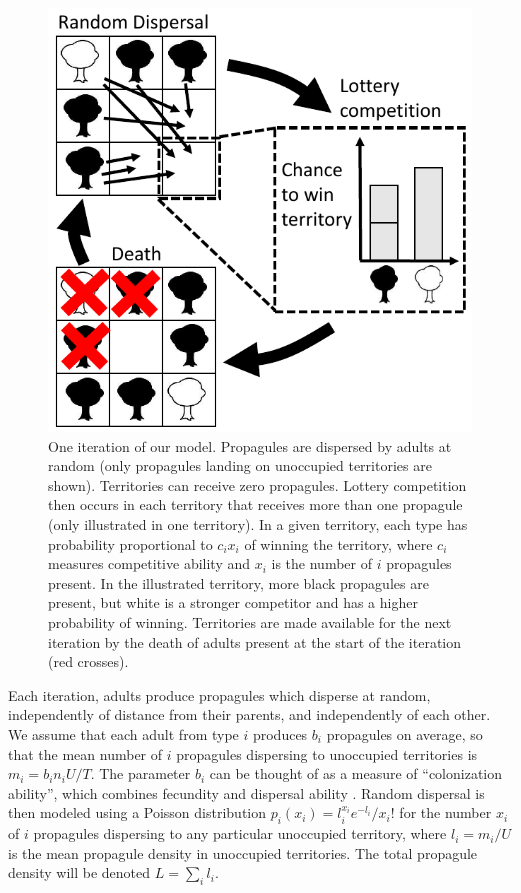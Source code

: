 \documentclass[12pt]{article}
\begin{document}
\begin{figure}
\centering
\includegraphics[scale=0.8]{lottery.pdf}
\caption{\label{fig:lottery} One iteration of our model. Propagules are dispersed by adults at random (only propagules landing on unoccupied territories are shown). Territories can receive zero propagules. Lottery competition then occurs in each territory that receives more than one propagule (only illustrated in one territory). In a given territory, each type has probability proportional to $c_i x_i$ of winning the territory, where $c_i$ measures competitive ability and $x_i$ is the number of $i$ propagules present. In the illustrated territory, more black propagules are present, but white is a stronger competitor and has a higher probability of winning. Territories are made available for the next iteration by the death of adults present at the start of the iteration (red crosses).}
\end{figure}

Each iteration, adults produce propagules which disperse at random, independently of distance from their parents, and independently of each other. We assume that each adult from type $i$ produces $b_i$ propagules on average, so that the mean number of $i$ propagules dispersing to unoccupied territories is $m_i=b_in_iU/T$. The parameter $b_i$ can be thought of as a measure of ``colonization ability'', which combines fecundity and dispersal ability \citep{levins_71,tilman_94,bolker_99}. Random dispersal is then modeled using a Poisson distribution $p_i(x_i)=l_i^{x_i} e^{-l_i}/x_i!$ for the number $x_i$ of $i$ propagules dispersing to any particular unoccupied territory, where $l_i=m_i/U$ is the mean propagule density in unoccupied territories. The total propagule density will be denoted $L=\sum_i l_i$.
\end{document}

